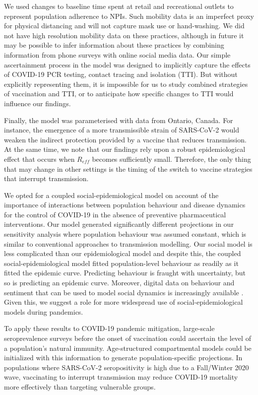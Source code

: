 We used changes to baseline time spent at retail and recreational outlets to represent population adherence to NPIs.  Such mobility data is an imperfect proxy for physical distancing and will not capture mask use or hand-washing.  We did not have high resolution mobility data on these practices, although in future it may be possible to infer information about these practices by combining information from phone surveys with online social media data. Our simple ascertainment process in the model was designed to implicitly capture the effects of COVID-19 PCR testing, contact tracing and isolation (TTI). But without explicitly representing them, it is impossible for us to study combined strategies of vaccination and TTI, or to anticipate how specific changes to TTI would influence our findings. 

Finally, the model was parameterised with data from Ontario, Canada. For instance, the emergence of a more transmissible strain of SARS-CoV-2 would weaken the indirect protection provided by a vaccine that reduces transmission. At the same time, we note that our findings rely upon a robust epidemiological effect that occurs when $R_{eff}$ becomes sufficiently small. Therefore, the only thing that may change in other settings is the timing of the switch to vaccine strategies that interrupt transmission. 


We opted for a coupled social-epidemiological model on account of the importance of interactions between population behaviour and disease dynamics for the control of COVID-19 in the absence of preventive pharmaceutical interventions. Our model generated significantly different projections in our sensitivity analysis where population behaviour was assumed constant, which is similar to conventional approaches to transmission modelling. Our social model is less complicated than our epidemiological model and despite this, the coupled social-epidemiological model fitted population-level behaviour as readily as it fitted the epidemic curve. Predicting behaviour is fraught with uncertainty, but so is predicting an epidemic curve. Moreover, digital data on behaviour and sentiment that can be used to model social dynamics is increasingly available \cite{salathe2012digital}.  Given this, we suggest a role for more widespread use of  social-epidemiological models during pandemics. 

To apply these results to COVID-19 pandemic mitigation, large-scale seroprevalence surveys before the onset of vaccination could ascertain the level of a population's natural immunity.  Age-structured compartmental models could be initialized with this information to generate population-specific projections. In populations where SARS-CoV-2 seropositivity is high due to a Fall/Winter 2020 wave, vaccinating to interrupt transmission may reduce COVID-19 mortality more effectively than targeting vulnerable groups. 

